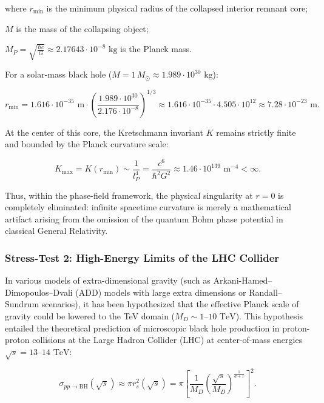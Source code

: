 \documentclass[11pt,a4paper]{article}
\theoremstyle{definition}
\begin{document}
where $r_{\text{min}}$ is the minimum physical radius of the collapsed interior remnant core;  

$M$ is the mass of the collapsing object;  

$M_P = \sqrt{\frac{\hbar c}{G}} \approx 2.17643 \cdot 10^{-8}\text{ kg}$ is the Planck mass.

For a solar-mass black hole ($M = 1\,M_\odot \approx 1.989 \cdot 10^{30}\text{ kg}$):

\begin{equation}\label{eq:5.57}\tag{5.57}
r_{\text{min}} = 1.616 \cdot 10^{-35}\text{ m} \cdot \left( \frac{1.989 \cdot 10^{30}}{2.176 \cdot 10^{-8}} \right)^{1/3} \approx 1.616 \cdot 10^{-35} \cdot 4.505 \cdot 10^{12} \approx 7.28 \cdot 10^{-23}\text{ m}.
\end{equation}

At the center of this core, the Kretschmann invariant $K$ remains strictly finite and bounded by the Planck curvature scale:

\begin{equation}\label{eq:5.58}\tag{5.58}
K_{\text{max}} = K(r_{\text{min}}) \sim \frac{1}{l_P^4} = \frac{c^6}{\hbar^2 G^2} \approx 1.46 \cdot 10^{139}\text{ m}^{-4} < \infty.
\end{equation}

Thus, within the phase-field framework, the physical singularity at $r = 0$ is completely eliminated: infinite spacetime curvature is merely a mathematical artifact arising from the omission of the quantum Bohm phase potential in classical General Relativity.

\subsubsection{Stress-Test 2: High-Energy Limits of the LHC Collider}\label{sec:5.4.2}

In various models of extra-dimensional gravity (such as Arkani-Hamed--Dimopoulos--Dvali (ADD) models with large extra dimensions or Randall--Sundrum scenarios), it has been hypothesized that the effective Planck scale of gravity could be lowered to the TeV domain ($M_D \sim 1\text{--}10\text{ TeV}$). This hypothesis entailed the theoretical prediction of microscopic black hole production in proton-proton collisions at the Large Hadron Collider (LHC) at center-of-mass energies $\sqrt{s} = 13\text{--}14\text{ TeV}$:

\begin{equation}\label{eq:5.59}\tag{5.59}
\sigma_{pp \to \text{BH}}(\sqrt{s}) \approx \pi r_s^2(\sqrt{s}) = \pi \left[ \frac{1}{M_D} \left( \frac{\sqrt{s}}{M_D} \right)^{\frac{1}{d+1}} \right]^2.
\end{equation}
\end{document}
